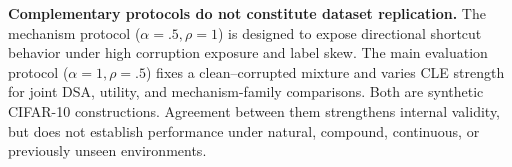 \textbf{Complementary protocols do not constitute dataset replication.}
The mechanism protocol ($\alpha=.5,\rho=1$) is designed to expose directional shortcut behavior under high corruption exposure and label skew. The main evaluation protocol ($\alpha=1,\rho=.5$) fixes a clean--corrupted mixture and varies CLE strength for joint DSA, utility, and mechanism-family comparisons. Both are synthetic CIFAR-10 constructions. Agreement between them strengthens internal validity, but does not establish performance under natural, compound, continuous, or previously unseen environments.

\ifdraftskeleton
{}
\fi
